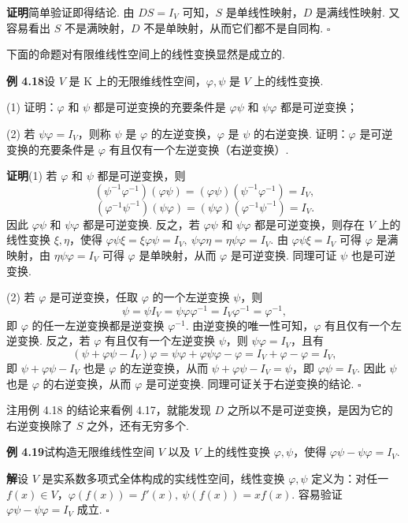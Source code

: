 \documentclass[UTF8,12pt,a4paper,fontset=fandol]{ctexart}
\begin{document}
\noindent\textbf{证明}\quad 简单验证即得结论. 由 $DS=I_V$ 可知，$S$ 是单线性映射，$D$ 是满线性映射. 又容易看出 $S$ 不是满映射，$D$ 不是单映射，从而它们都不是自同构. $\square$

下面的命题对有限维线性空间上的线性变换显然是成立的.

\noindent\textbf{例 4.18}\quad 设 $V$ 是 $\mathrm{K}$ 上的无限维线性空间，$\varphi,\psi$ 是 $V$ 上的线性变换.

(1) 证明：$\varphi$ 和 $\psi$ 都是可逆变换的充要条件是 $\varphi\psi$ 和 $\psi\varphi$ 都是可逆变换；

(2) 若 $\psi\varphi=I_V$，则称 $\psi$ 是 $\varphi$ 的左逆变换，$\varphi$ 是 $\psi$ 的右逆变换. 证明：$\varphi$ 是可逆变换的充要条件是 $\varphi$ 有且仅有一个左逆变换（右逆变换）.

\noindent\textbf{证明}\quad (1) 若 $\varphi$ 和 $\psi$ 都是可逆变换，则
\[
(\psi^{-1}\varphi^{-1})(\varphi\psi)=(\varphi\psi)(\psi^{-1}\varphi^{-1})=I_V,
\]
\[
(\varphi^{-1}\psi^{-1})(\psi\varphi)=(\psi\varphi)(\varphi^{-1}\psi^{-1})=I_V.
\]
因此 $\varphi\psi$ 和 $\psi\varphi$ 都是可逆变换. 反之，若 $\varphi\psi$ 和 $\psi\varphi$ 都是可逆变换，则存在 $V$ 上的线性变换 $\xi,\eta$，使得 $\varphi\psi\xi=\xi\varphi\psi=I_V,\ \psi\varphi\eta=\eta\psi\varphi=I_V$. 由 $\varphi\psi\xi=I_V$ 可得 $\varphi$ 是满映射，由 $\eta\psi\varphi=I_V$ 可得 $\varphi$ 是单映射，从而 $\varphi$ 是可逆变换. 同理可证 $\psi$ 也是可逆变换.

(2) 若 $\varphi$ 是可逆变换，任取 $\varphi$ 的一个左逆变换 $\psi$，则
\[
\psi=\psi I_V=\psi\varphi\varphi^{-1}=I_V\varphi^{-1}=\varphi^{-1},
\]
即 $\varphi$ 的任一左逆变换都是逆变换 $\varphi^{-1}$. 由逆变换的唯一性可知，$\varphi$ 有且仅有一个左逆变换. 反之，若 $\varphi$ 有且仅有一个左逆变换 $\psi$，则 $\psi\varphi=I_V$，且有
\[
(\psi+\varphi\psi-I_V)\varphi=\psi\varphi+\varphi\psi\varphi-\varphi=I_V+\varphi-\varphi=I_V,
\]
即 $\psi+\varphi\psi-I_V$ 也是 $\varphi$ 的左逆变换，从而 $\psi+\varphi\psi-I_V=\psi$，即 $\varphi\psi=I_V$. 因此 $\psi$ 也是 $\varphi$ 的右逆变换，从而 $\varphi$ 是可逆变换. 同理可证关于右逆变换的结论. $\square$

注\quad 用例 4.18 的结论来看例 4.17，就能发现 $D$ 之所以不是可逆变换，是因为它的右逆变换除了 $S$ 之外，还有无穷多个.

\noindent\textbf{例 4.19}\quad 试构造无限维线性空间 $V$ 以及 $V$ 上的线性变换 $\varphi,\psi$，使得 $\varphi\psi-\psi\varphi=I_V$.

\noindent\textbf{解}\quad 设 $V$ 是实系数多项式全体构成的实线性空间，线性变换 $\varphi,\psi$ 定义为：对任一 $f(x)\in V$，$\varphi(f(x))=f'(x),\ \psi(f(x))=xf(x)$. 容易验证 $\varphi\psi-\psi\varphi=I_V$ 成立. $\square$
\end{document}
